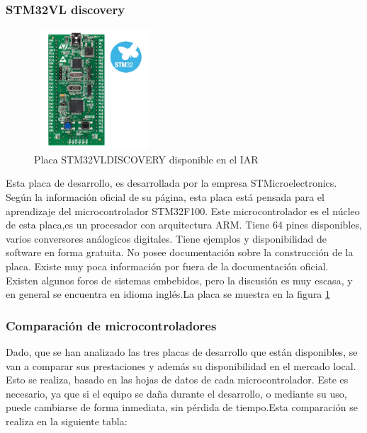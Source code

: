 \subsubsection{STM32VL discovery}

\begin{figure}
	\includegraphics[width=0.4\textwidth,height=45mm] {stm32vl}
	\caption{Placa STM32VLDISCOVERY disponible en el IAR}
	\label{fig:stm32}
\end{figure}

Esta placa de desarrollo, es desarrollada por la empresa STMicroelectronics. Según la información oficial de su página, esta placa está pensada para el aprendizaje del microcontrolador STM32F100. Este microcontrolador es el núcleo de esta placa,es un procesador con arquitectura ARM. Tiene 64 pines disponibles, varios conversores análogicos digitales. Tiene ejemplos y disponibilidad de software en forma gratuita. No posee documentación sobre la construcción de la placa. Existe muy poca información por fuera de la documentación oficial. Existen algunos foros de sistemas embebidos, pero la discusión es muy escasa, y en general se encuentra en idioma inglés.La placa se muestra en la figura \ref{fig:stm32}








\subsubsection{Comparación de microcontroladores} 
Dado, que se han analizado las tres placas de desarrollo que están disponibles, se van a comparar sus prestaciones y además su disponibilidad en el mercado local. Esto se realiza, basado en las hojas de datos de cada microcontrolador. Este es necesario, ya que si el equipo se daña durante el desarrollo, o mediante su uso, puede cambiarse de forma inmediata, sin pérdida de tiempo.Esta comparación se realiza en la siguiente tabla:  

